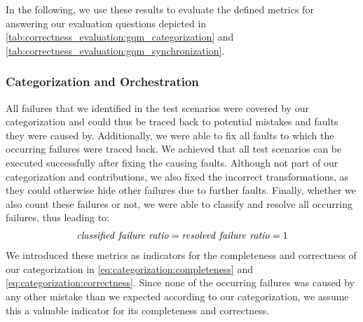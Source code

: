 In the following, we use these results to evaluate the defined metrics for answering our evaluation questions depicted in \autoref{tab:correctness_evaluation:gqm_categorization} and \autoref{tab:correctness_evaluation:gqm_synchronization}.







\subsubsection{Categorization and Orchestration}

All failures that we identified in the test scenarios were covered by our categorization and could thus be traced back to potential mistakes and faults they were caused by.
Additionally, we were able to fix all faults to which the occurring failures were traced back.
We achieved that all test scenarios can be executed successfully after fixing the causing faults.
Although not part of our categorization and contributions, we also fixed the incorrect transformations, as they could otherwise hide other failures due to further faults.
Finally, whether we also count these failures or not, we were able to classify and resolve all occurring failures, thus leading to:
\begin{align*}
    \mathvariable{classified\ failure\ ratio} = \mathvariable{resolved\ failure\ ratio}= 1
\end{align*}
We introduced these metrics as indicators for the completeness and correctness of our categorization in \autoref{eq:categorization:completeness} and \autoref{eq:categorization:correctness}.
Since none of the occurring failures was caused by any other mistake than we expected according to our categorization, we assume this a valuable indicator for its completeness and correctness.

